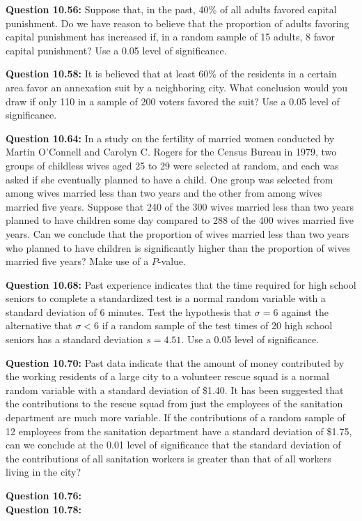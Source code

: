 \documentclass{article}
\begin{document}
\textbf{Question 10.56:}
Suppose that, in the past, 40\% of all adults
favored capital punishment. Do we have reason to
believe that the proportion of adults favoring capital
punishment has increased if, in a random sample of 15
adults, 8 favor capital punishment? Use a 0.05 level of
significance.
\newline

\textbf{Question 10.58:}
It is believed that at least 60\% of the residents
in a certain area favor an annexation suit by a 
neighboring city. What conclusion would you draw if only
110 in a sample of 200 voters favored the suit? Use a
0.05 level of significance.
\newline

\textbf{Question 10.64:}
In a study on the fertility of married women
conducted by Martin O’Connell and Carolyn C. Rogers
for the Census Bureau in 1979, two groups of childless
wives aged 25 to 29 were selected at random, and each
was asked if she eventually planned to have a child.
One group was selected from among wives married
less than two years and the other from among wives
married five years. Suppose that 240 of the 300 wives
married less than two years planned to have children
some day compared to 288 of the 400 wives married
five years. Can we conclude that the proportion of
wives married less than two years who planned to have
children is significantly higher than the proportion of
wives married five years? Make use of a $P$-value.
\newline

\textbf{Question 10.68:}
Past experience indicates that the time required 
for high school seniors to complete a standardized 
test is a normal random variable with a standard
deviation of 6 minutes. Test the hypothesis that $\sigma = 6$
against the alternative that $\sigma < 6$ if a random sample of
the test times of 20 high school seniors has a standard
deviation $s = 4.51$. Use a 0.05 level of significance.
\newline

\textbf{Question 10.70:}
Past data indicate that the amount of money
contributed by the working residents of a large city to
a volunteer rescue squad is a normal random variable
with a standard deviation of \$1.40. It has been 
suggested that the contributions to the rescue squad from
just the employees of the sanitation department are
much more variable. If the contributions of a random
sample of 12 employees from the sanitation department
have a standard deviation of \$1.75, can we conclude at
the 0.01 level of significance that the standard 
deviation of the contributions of all sanitation workers is
greater than that of all workers living in the city?
\newline

\textbf{Question 10.76:}
\\

\textbf{Question 10.78:}
\end{document}
